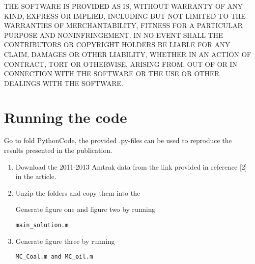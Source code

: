 \documentclass[english]{article}
\begin{document}
THE SOFTWARE IS PROVIDED \textquotedbl{}AS IS\textquotedbl{}, WITHOUT
WARRANTY OF ANY KIND, EXPRESS OR IMPLIED, INCLUDING BUT NOT LIMITED
TO THE WARRANTIES OF MERCHANTABILITY, FITNESS FOR A PARTICULAR PURPOSE
AND NONINFRINGEMENT. IN NO EVENT SHALL THE CONTRIBUTORS OR COPYRIGHT
HOLDERS BE LIABLE FOR ANY CLAIM, DAMAGES OR OTHER LIABILITY, WHETHER
IN AN ACTION OF CONTRACT, TORT OR OTHERWISE, ARISING FROM, OUT OF
OR IN CONNECTION WITH THE SOFTWARE OR THE USE OR OTHER DEALINGS WITH
THE SOFTWARE.





\section{Running the code}
Go to fold PythonCode, the provided .py-files can be used to reproduce the results presented in the publication.
\begin{enumerate}
\item Download the 2011-2013 Amtrak data from the link provided in reference [2] in the article.

\item Unzip the folders and copy them into the 

Generate figure one and figure two by running

\begin{verbatim}main_solution.m\end{verbatim}
 \item Generate figure three by running
 \begin{verbatim}MC_Coal.m and MC_oil.m\end{verbatim}
\end{enumerate}
\end{document}
